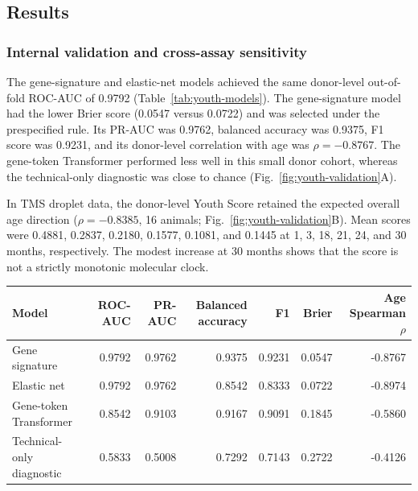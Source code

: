 \documentclass[10pt,twocolumn]{article}
\begin{document}
\subsection{Results}

\subsubsection{Internal validation and cross-assay sensitivity}

The gene-signature and elastic-net models achieved the same donor-level out-of-fold ROC-AUC of 0.9792 (Table~\ref{tab:youth-models}). The gene-signature model had the lower Brier score (0.0547 versus 0.0722) and was selected under the prespecified rule. Its PR-AUC was 0.9762, balanced accuracy was 0.9375, F1 score was 0.9231, and its donor-level correlation with age was $\rho=-0.8767$. The gene-token Transformer performed less well in this small donor cohort, whereas the technical-only diagnostic was close to chance (Fig.~\ref{fig:youth-validation}A).

In TMS droplet data, the donor-level Youth Score retained the expected overall age direction ($\rho=-0.8385$, 16 animals; Fig.~\ref{fig:youth-validation}B). Mean scores were 0.4881, 0.2837, 0.2180, 0.1577, 0.1081, and 0.1445 at 1, 3, 18, 21, 24, and 30 months, respectively. The modest increase at 30 months shows that the score is not a strictly monotonic molecular clock.

\begin{strip}
\noindent\begin{minipage}{\textwidth}
\centering
{}
\label{tab:youth-models}
\begin{tabular}{lrrrrrr}
\toprule
Model & ROC-AUC & PR-AUC & Balanced accuracy & F1 & Brier & Age Spearman $\rho$ \\
\midrule
Gene signature & 0.9792 & 0.9762 & 0.9375 & 0.9231 & 0.0547 & -0.8767 \\
Elastic net & 0.9792 & 0.9762 & 0.8542 & 0.8333 & 0.0722 & -0.8974 \\
Gene-token Transformer & 0.8542 & 0.9103 & 0.9167 & 0.9091 & 0.1845 & -0.5860 \\
Technical-only diagnostic & 0.5833 & 0.5008 & 0.7292 & 0.7143 & 0.2722 & -0.4126 \\
\bottomrule
\end{tabular}
\end{minipage}
\end{strip}
\end{document}
